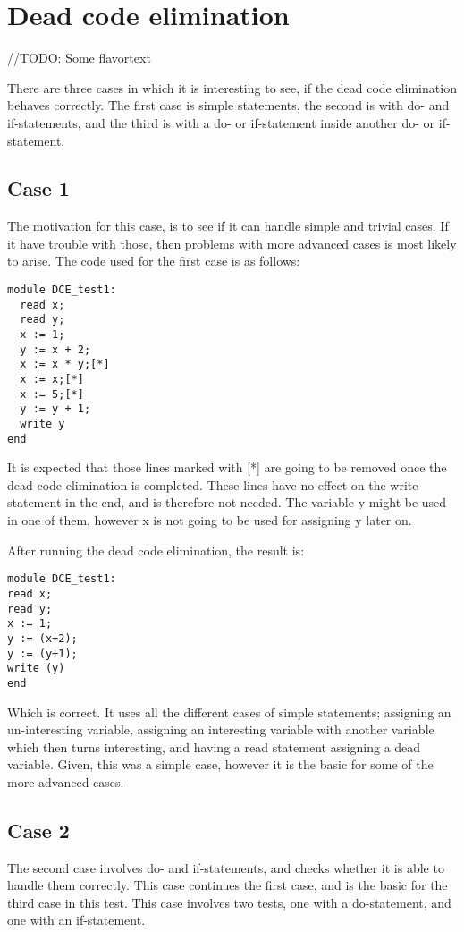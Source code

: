 \section{Dead code elimination}
//TODO: Some flavortext

There are three cases in which it is interesting to see, if the dead code elimination behaves correctly. The first case is simple statements, the second is with do- and if-statements, and the third is with a do- or if-statement inside another do- or if-statement.

\subsection{Case 1}
The motivation for this case, is to see if it can handle simple and trivial cases. If it have trouble with those, then problems with more advanced cases is most likely to arise. The code used for the first case is as follows:
\begin{lstlisting}
module DCE_test1:
  read x;
  read y;
  x := 1;
  y := x + 2;
  x := x * y;[*]
  x := x;[*]
  x := 5;[*]
  y := y + 1;
  write y
end
\end{lstlisting}
It is expected that those lines marked with [*] are going to be removed once the dead code elimination is completed. These lines have no effect on the write statement in the end, and is therefore not needed. The variable y might be used in one of them, however x is not going to be used for assigning y later on.

After running the dead code elimination, the result is:
\begin{lstlisting}
module DCE_test1:
read x;
read y;
x := 1;
y := (x+2);
y := (y+1);
write (y)
end
\end{lstlisting}
Which is correct. It uses all the different cases of simple statements; assigning an un-interesting variable, assigning an interesting variable with another variable which then turns interesting, and having a read statement assigning a dead variable. Given, this was a simple case, however it is the basic for some of the more advanced cases.

\subsection{Case 2}
The second case involves do- and if-statements, and checks whether it is able to handle them correctly. This case continues the first case, and is the basic for the third case in this test. This case involves two tests, one with a do-statement, and one with an if-statement.

